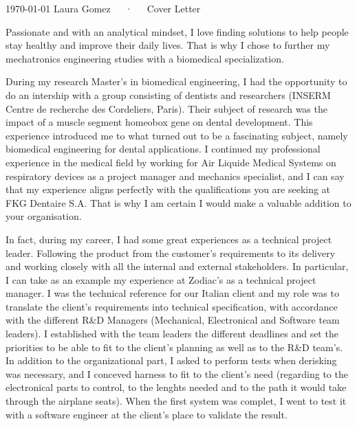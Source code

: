 \documentclass[11pt, a4paper]{awesome-cv}
\begin{document}
\makecvheader[R]

\makecvfooter
  {\today}
  {Laura Gomez~~~·~~~Cover Letter}
  {}

\makelettertitle

\begin{cvletter}


Passionate and with an analytical mindset, I love finding solutions to help people stay healthy and improve their daily lives.
That is why I chose to further my mechatronics engineering studies with a biomedical specialization. 

During my research Master's in biomedical engineering, I had the opportunity to do an intership with a group consisting of dentists and researchers (INSERM Centre de recherche des Cordeliers, Paris). 
Their subject of research was the impact of a muscle segment homeobox gene on dental development. 
This experience introduced me to what turned out to be a fascinating subject, namely biomedical engineering for dental applications. I continued my professional experience in the medical field by working for Air Liquide Medical Systems on respiratory devices as a project manager and mechanics specialist, 
and I can say that my experience aligns perfectly with the qualifications you are seeking at FKG Dentaire S.A.
That is why I am certain I would make a valuable addition to your organisation.

In fact, during my career, I had some great experiences as a technical project leader. 
Following the product from the customer's requirements to its delivery and working closely with all the internal and external stakeholders.
In particular, I can take as an example my experience at Zodiac's as a technical project manager. 
I was the technical reference for our Italian client and my role was to translate the client's requirements into technical specification, with accordance with the different R\&D Managers (Mechanical, Electronical and Software team leaders).
I established with the team leaders the different deadlines and set the priorities to be able to fit to the client's planning as well as to the R\&D team's.
In addition to the organizational part, I asked to perform tests when derisking was necessary, and I conceved harness to fit to the client's need (regarding to the electronical parts to control, to the lenghts needed and to the path it would take through the airplane seats).
When the first system was complet, I went to test it with a software engineer at the client's place to validate the result.


\end{cvletter}
\end{document}
